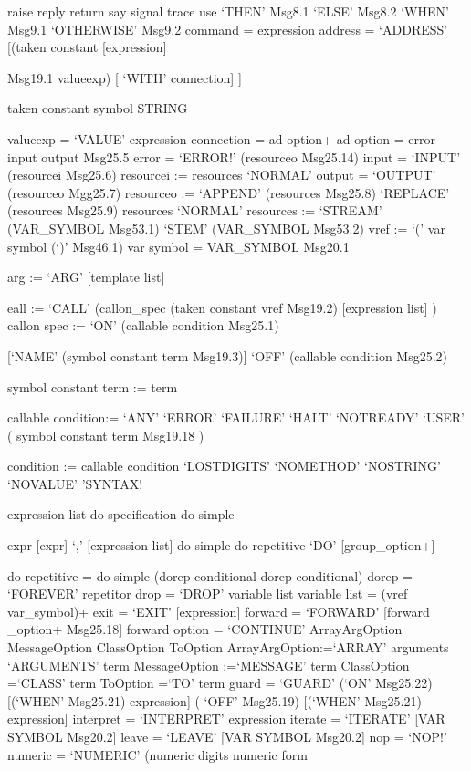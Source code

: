 raise \textbar{} reply \textbar{} return \textbar{} say \textbar{}
signal \textbar{} trace \textbar{} use `THEN' Msg8.1 `ELSE' Msg8.2
`WHEN' Msg9.1 \textbar{} `OTHERWISE' Msg9.2 command = expression address
= `ADDRESS' {[}(taken constant {[}expression{]}

Msg19.1 \textbar{} valueexp) {[} `WITH' connection{]} {]}

taken constant symbol \textbar{} STRING

valueexp = `VALUE' expression connection = ad option+ ad option = error
\textbar{} input \textbar{} output \textbar{} Msg25.5 error = `ERROR!'
(resourceo \textbar{} Msg25.14) input = `INPUT' (resourcei \textbar{}
Msg25.6) resourcei := resources \textbar{} `NORMAL' output = `OUTPUT'
(resourceo \textbar{} Mgg25.7) resourceo := `APPEND' (resources
\textbar{} Msg25.8) \textbar{} `REPLACE' (resources \textbar{} Msg25.9)
\textbar{} resources \textbar{} `NORMAL' resources := `STREAM'
(VAR\_SYMBOL \textbar{} Msg53.1) \textbar{} `STEM' (VAR\_SYMBOL
\textbar{} Msg53.2) vref := `(' var symbol (`)' \textbar{} Msg46.1) var
symbol = VAR\_SYMBOL \textbar{} Msg20.1

arg := `ARG' {[}template list{]}

eall := `CALL' (callon\_spec \textbar{} (taken constant \textbar{} vref
\textbar{} Msg19.2) {[}expression list{]} ) callon spec := `ON'
(callable condition \textbar{} Msg25.1)

{[}`NAME' (symbol constant term \textbar{} Msg19.3){]} \textbar{} `OFF'
(callable condition \textbar{} Msg25.2)

symbol constant term := term

callable condition:= `ANY' \textbar{} `ERROR' \textbar{} `FAILURE'
\textbar{} `HALT' \textbar{} `NOTREADY' \textbar{} `USER' ( symbol
constant term \textbar{} Msg19.18 )

condition := callable condition \textbar{} `LOSTDIGITS' \textbar{}
`NOMETHOD' \textbar{} `NOSTRING' \textbar{} `NOVALUE' \textbar{}
'SYNTAX!

expression list do specification do simple

expr \textbar{} {[}expr{]} `,' {[}expression list{]} do simple
\textbar{} do repetitive `DO' {[}group\_option+{]}

do repetitive = do simple (dorep \textbar{} conditional \textbar{} dorep
conditional) dorep = `FOREVER' \textbar{} repetitor drop = `DROP'
variable list variable list = (vref \textbar{} var\_symbol)+ exit =
`EXIT' {[}expression{]} forward = `FORWARD' {[}forward \_option+
\textbar{} Msg25.18{]} forward option = `CONTINUE' \textbar{}
ArrayArgOption \textbar{} MessageOption \textbar{} ClassOption
\textbar{} ToOption ArrayArgOption:=`ARRAY' arguments \textbar{}
`ARGUMENTS' term MessageOption :=`MESSAGE' term ClassOption =`CLASS'
term ToOption =`TO' term guard = `GUARD' (`ON' \textbar{} Msg25.22)
{[}(`WHEN' \textbar{} Msg25.21) expression{]} \textbar{} ( `OFF'
\textbar{} Msg25.19) {[}(`WHEN' \textbar{} Msg25.21) expression{]}
interpret = `INTERPRET' expression iterate = `ITERATE' {[}VAR SYMBOL
\textbar{} Msg20.2{]} leave = `LEAVE' {[}VAR SYMBOL \textbar{}
Msg20.2{]} nop = `NOP!' numeric = `NUMERIC' (numeric digits \textbar{}
numeric form

